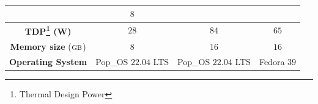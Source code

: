 \begin{center}
\begin{longtable}{|c|c|c|c|}
		                                                & $8$
		\\\hline
		\textbf{TDP\footnote{Thermal Design Power} (W)} & $28$
		                                                & $84$
		                                                & $65$
		\\\hline
		\textbf{Memory size} ($\textsc{gb}$)            & $8$
		                                                & $16$
		                                                & $16$
		\\\hline
		\textbf{Operating System}                       & Pop\!\_OS $22.04$ LTS
		                                                & Pop\!\_OS $22.04$ LTS
		                                                & Fedora $39$
		\\\hline
	\end{longtable}
\end{center}








